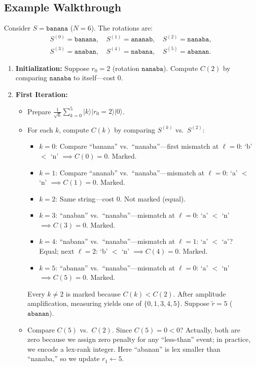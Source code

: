 \documentclass[11pt,letterpaper]{article}
\begin{document}
\subsection{Example Walkthrough}
\label{sec:algorithm:example}
Consider \(S = \texttt{banana}\) (\(N=6\)). The rotations are:
\[
\begin{aligned}
  &S^{(0)} = \texttt{banana}, \quad S^{(1)} = \texttt{ananab}, \quad S^{(2)} = \texttt{nanaba},\\
  &S^{(3)} = \texttt{anaban}, \quad S^{(4)} = \texttt{nabana}, \quad S^{(5)} = \texttt{abanan}.
\end{aligned}
\]
\begin{enumerate}
    \item \textbf{Initialization:} Suppose \(r_{0} = 2\) (rotation \(\texttt{nanaba}\)). Compute \(C(2)\) by comparing \(\texttt{nanaba}\) to itself---cost \(0\).
    \item \textbf{First Iteration:}
    \begin{itemize}
        \item Prepare \(\frac{1}{\sqrt{6}}\sum_{k=0}^{5}\lvert k\rangle\lvert r_{0}=2\rangle\lvert 0\rangle\).
        \item For each \(k\), compute \(C(k)\) by comparing \(S^{(k)}\) vs.\ \(S^{(2)}\):
        \begin{itemize}
            \item \(k=0\): Compare ``banana'' vs.\ ``nanaba''---first mismatch at \(\ell=0\): `b' $<$ `n' \(\implies C(0)=0\). Marked.
            \item \(k=1\): Compare ``ananab'' vs.\ ``nanaba''---mismatch at \(\ell=0\): `a' $<$ `n' \(\implies C(1)=0\). Marked.
            \item \(k=2\): Same string---cost \(0\). Not marked (equal).
            \item \(k=3\): ``anaban'' vs.\ ``nanaba''---mismatch at \(\ell=0\): `a' $<$ `n' \(\implies C(3)=0\). Marked.
            \item \(k=4\): ``nabana'' vs.\ ``nanaba''---mismatch at \(\ell=1\): `a' $<$ `a'? Equal; next \(\ell=2\): `b' $<$ `n' \(\implies C(4)=0\). Marked.
            \item \(k=5\): ``abanan'' vs.\ ``nanaba''---mismatch at \(\ell=0\): `a' $<$ `n' \(\implies C(5)=0\). Marked.
        \end{itemize}
        Every \(k\neq 2\) is marked because \(C(k) < C(2)\). After amplitude amplification, measuring yields one of \(\{0,1,3,4,5\}\). Suppose \(\tilde r=5\) (\(\texttt{abanan}\)).
        \item Compare \(C(5)\) vs.\ \(C(2)\). Since \(C(5)=0 < 0\)? Actually, both are zero because we assign zero penalty for any ``less-than'' event; in practice, we encode a lex-rank integer. Here ``abanan'' is lex smaller than ``nanaba,'' so we update \(r_{1} \leftarrow 5\).

\end{itemize}
\end{enumerate}
\end{document}
